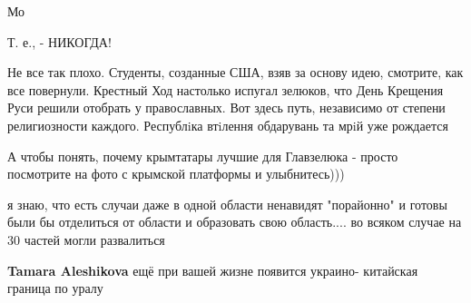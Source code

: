 \begin{itemize}
Мо

 
Т. е., - НИКОГДА!

 

Не все так плохо. Студенты, созданные США, взяв за основу идею, смотрите, как
все повернули. Крестный Ход настолько испугал зелюков, что День Крещения Руси
решили отобрать у православных. Вот здесь путь, независимо от степени
религиозности каждого. Республiка втiлення обдарувань та мрiй уже рождается


 

А чтобы понять, почему крымтатары лучшие для Главзелюка - просто посмотрите на
фото с крымской платформы и улыбнитесь)))


 

я знаю, что есть случаи даже в одной области ненавидят "порайонно" и готовы
были бы отделиться от области и образовать свою область.... во всяком случае на
30 частей могли развалиться

\begin{itemize}
 
\textbf{Tamara Aleshikova} ещё при вашей жизне появится украино- китайская граница по уралу
\end{itemize}

 

\end{itemize}
